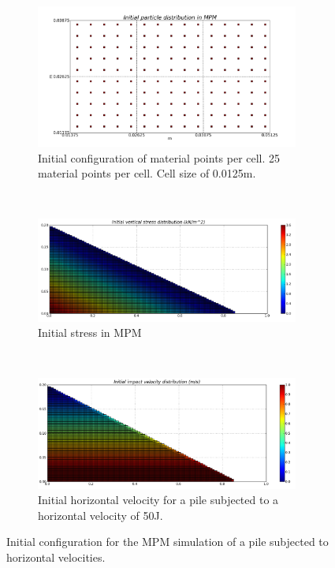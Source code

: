 \begin{figure}[tbhp]
\centering
\begin{subfigure}[t]{0.75\textwidth}
\centering
\includegraphics[width=0.95\textwidth]{MPM_Initial_PIC_Slope}
\caption{Initial configuration of material points per cell. 25 material points 
per cell. Cell size of 0.0125m.}
\label{fig:MPM_Initial_PIC_Slope}
\end{subfigure} \\
%
\begin{subfigure}[t]{0.95\textwidth}
\centering
\includegraphics[width=0.95\textwidth]{MPM_Stress_Slope}
\caption{Initial stress in MPM}
\label{fig:MPM_Stress_Slope}
\end{subfigure} \\
%
\begin{subfigure}[t]{0.95\textwidth}
\centering
\includegraphics[width=0.95\textwidth]{MPM_Velocity_Slope}
\caption{Initial horizontal velocity for a pile subjected to a horizontal 
velocity of 50J.}
\label{fig:MPM_Velocity_Slope}
\end{subfigure}
\caption{Initial configuration for the MPM simulation of a pile subjected to 
horizontal velocities.}
\label{fig:MPM_Slope_setup}
\end{figure}


